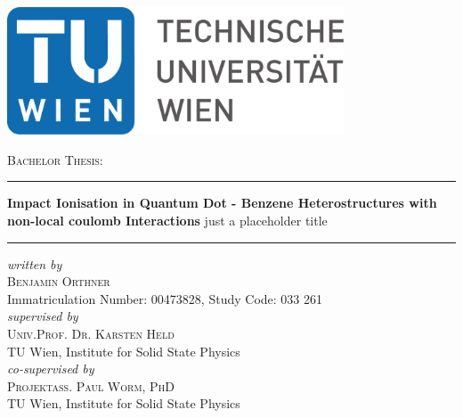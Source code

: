 \documentclass[hidelinks,oneside]{scrbook}			%
\begin{document}
\begin{titlepage}
\begin{center}
    \vspace*{15mm}
    \includegraphics[width=100mm]{./graph/TU_Logo.pdf}
    
    \vspace{20mm}
    
    {\Large \textsc{Bachelor Thesis:}}
    
    \vspace{7mm}
    
    \rule{\textwidth}{0.4pt}\vspace{5mm}
    {\LARGE \textbf{Impact Ionisation in Quantum Dot - Benzene Heterostructures with non-local coulomb Interactions}} just a placeholder title\\[3mm]
    \rule{\textwidth}{0.4pt}
    
    \vspace{15mm}
    \emph{written by}\\
    {\Large \textsc{Benjamin Orthner}}\\
    Immatriculation Number: 00473828, Study Code: 033 261\\
    
    \vspace{15mm}
    \emph{supervised by}\\
    {\Large \textsc{Univ.Prof. Dr. Karsten Held}}\\
    TU Wien, Institute for Solid State Physics\\
    
    \vspace{15mm}
    \emph{co-supervised by}\\
    {\Large \textsc{Projektass. Paul Worm, PhD}}\\
    TU Wien, Institute for Solid State Physics\\
\end{center}

  \date{\today}
\vspace{\fill}
\begin{flushright} %
\makeatletter
\@date
\makeatother
\end{flushright}
\end{titlepage}
\end{document}
